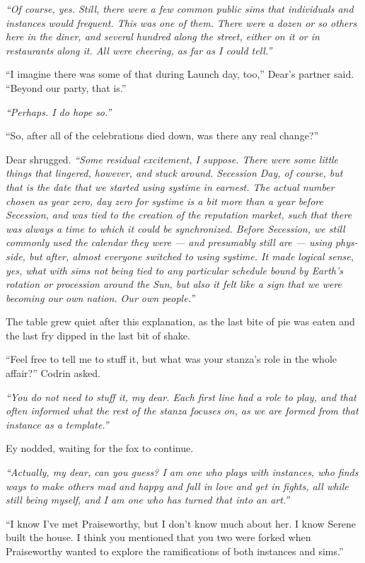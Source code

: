 \emph{``Of course, yes. Still, there were a few common public sims that individuals and instances would frequent. This was one of them. There were a dozen or so others here in the diner, and several hundred along the street, either on it or in restaurants along it. All were cheering, as far as I could tell.''}

``I imagine there was some of that during Launch day, too,'' Dear's partner said. ``Beyond our party, that is.''

\emph{``Perhaps. I do hope so.''}

``So, after all of the celebrations died down, was there any real change?''

Dear shrugged. \emph{``Some residual excitement, I suppose. There were some little things that lingered, however, and stuck around. Secession Day, of course, but that is the date that we started using systime in earnest. The actual number chosen as year zero, day zero for systime is a bit more than a year before Secession, and was tied to the creation of the reputation market, such that there was always a time to which it could be synchronized. Before Secession, we still commonly used the calendar they were — and presumably still are — using phys-side, but after, almost everyone switched to using systime. It made logical sense, yes, what with sims not being tied to any particular schedule bound by Earth's rotation or procession around the Sun, but also it felt like a sign that we were becoming our own nation. Our own people.''}

The table grew quiet after this explanation, as the last bite of pie was eaten and the last fry dipped in the last bit of shake.

``Feel free to tell me to stuff it, but what was your stanza's role in the whole affair?'' Codrin asked.

\emph{``You do not need to stuff it, my dear. Each first line had a role to play, and that often informed what the rest of the stanza focuses on, as we are formed from that instance as a template.''}

Ey nodded, waiting for the fox to continue.

\emph{``Actually, my dear, can you guess? I am one who plays with instances, who finds ways to make others mad and happy and fall in love and get in fights, all while still being myself, and I am one who has turned that into an art.''}

``I know I've met Praiseworthy, but I don't know much about her. I know Serene built the house. I think you mentioned that you two were forked when Praiseworthy wanted to explore the ramifications of both instances and sims.''

